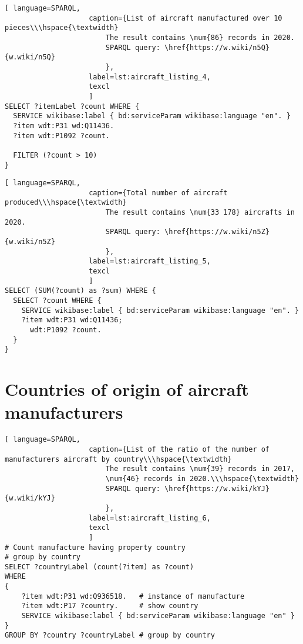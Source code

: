 \begin{lstlisting}[ language=SPARQL, 
                    caption={List of aircraft manufactured over 10 pieces\\\hspace{\textwidth}
                        The result contains \num{86} records in 2020.
                        SPARQL query: \href{https://w.wiki/n5Q}{w.wiki/n5Q}
                        },
                    label=lst:aircraft_listing_4,
                    texcl 
                    ]
SELECT ?itemLabel ?count WHERE {
  SERVICE wikibase:label { bd:serviceParam wikibase:language "en". }
  ?item wdt:P31 wd:Q11436.
  ?item wdt:P1092 ?count.
  
  FILTER (?count > 10)
}
\end{lstlisting}


\begin{lstlisting}[ language=SPARQL, 
                    caption={Total number of aircraft produced\\\hspace{\textwidth}
                        The result contains \num{33 178} aircrafts in 2020.
                        SPARQL query: \href{https://w.wiki/n5Z}{w.wiki/n5Z}
                        },
                    label=lst:aircraft_listing_5,
                    texcl 
                    ]
SELECT (SUM(?count) as ?sum) WHERE {
  SELECT ?count WHERE {
    SERVICE wikibase:label { bd:serviceParam wikibase:language "en". }
    ?item wdt:P31 wd:Q11436;
      wdt:P1092 ?count.
  }
}
\end{lstlisting}


\section{Countries of origin of aircraft manufacturers}

\begin{lstlisting}[ language=SPARQL, 
                    caption={List of the ratio of the number of manufacturers aircraft by country\\\hspace{\textwidth}
                        The result contains \num{39} records in 2017, 
                        \num{46} records in 2020.\\\hspace{\textwidth}
                        SPARQL query: \href{https://w.wiki/kYJ}{w.wiki/kYJ}
                        },
                    label=lst:aircraft_listing_6,
                    texcl 
                    ]
# Count manufacture having property country
# group by country
SELECT ?countryLabel (count(?item) as ?count)
WHERE
{
    ?item wdt:P31 wd:Q936518.   # instance of manufacture
    ?item wdt:P17 ?country.     # show country
    SERVICE wikibase:label { bd:serviceParam wikibase:language "en" }
}
GROUP BY ?country ?countryLabel # group by country
\end{lstlisting}

